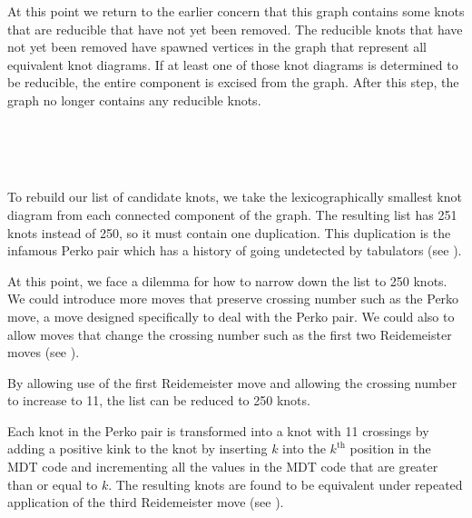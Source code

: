 \begin{paper}
At this point we return to the earlier concern that this graph contains some
knots that are reducible that have not yet been removed.
The reducible knots that have not yet been removed have spawned vertices in the
graph that represent all equivalent knot diagrams.
If at least one of those knot diagrams is determined to be reducible, the entire
component is excised from the graph.
After this step, the graph no longer contains any reducible knots.

\\

\vspace{-4.5em}\hspace{15ex}{\fontsize{20pt}{1em}\selectfont$\equiv$}\\

\vspace{-5em}\hfill{}\\


To rebuild our list of candidate knots, we take the lexicographically smallest
knot diagram from each connected component of the graph.
The resulting list has 251 knots instead of 250, so it must contain one
duplication.
This duplication is the infamous Perko pair which has a
history of going undetected by tabulators (see \figPerko).

At this point, we face a dilemma for how to narrow down the list to 250 knots.
We could introduce more moves that preserve crossing number such as the Perko
move, a move designed specifically to deal with the Perko pair.
We could also to allow moves that change the crossing number such as the first
two Reidemeister moves (see \figMoves).

By allowing use of the first Reidemeister move and allowing the crossing number
to increase to 11, the list can be reduced to 250 knots.


Each knot in the Perko pair is transformed into a knot with 11 crossings by
adding a positive kink to the knot by inserting $k$ into the $k^\text{th}$
position in the MDT code and incrementing all the values in the MDT code that
are greater than or equal to $k$.
The resulting knots are found to be equivalent under repeated application of the
third Reidemeister move (see \figMoves).


\end{paper}
